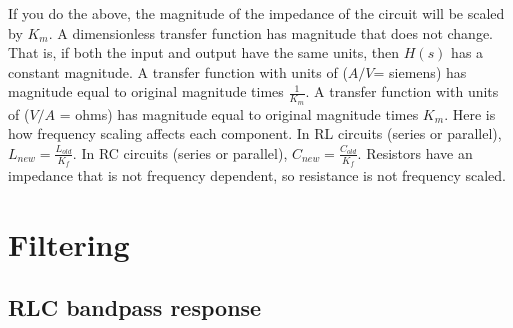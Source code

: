 \documentclass[nobib]{tufte-handout}
\begin{document}
If you do the above, the magnitude of 
the impedance of the circuit will be 
scaled by $K_m$. 
A dimensionless transfer function has magnitude that
does not change. That is, if both 
the input and output have the same 
units, then $H(s)$ has a constant 
magnitude. 
A transfer function with units of ($A/V$= siemens) has
magnitude equal to original magnitude times $\frac{1}{K_m}$.
A transfer function with units of ($V/A$ = ohms) has
magnitude equal to original magnitude times $K_m$.
Here is how frequency scaling affects each component. 
In RL circuits (series or parallel), $L_{new} = \frac{L_{old}}{K_f}$.
In RC circuits (series or parallel), $C_{new} = \frac{C_{old}}{K_f}$. 
Resistors have an impedance that is not frequency dependent, 
so resistance is not frequency scaled. 

\pagebreak

\section{Filtering}

\subsection{RLC bandpass response}
\end{document}
